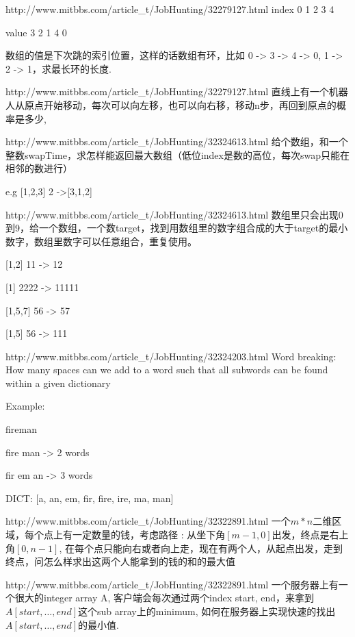 \documentclass[a4paper]{article}
\begin{document}
\begin{CJK}{UTF8}{gbsn}
\begin{enumerate}
\begin{Q}[Google]{http://www.mitbbs.com/article_t/JobHunting/32279127.html}
index 0 1 2 3 4

value 3 2 1 4 0

数组的值是下次跳的索引位置，这样的话数组有环，比如 0 -> 3 -> 4 -> 0, 1 -> 2 
-> 1，求最长环的长度.
\end{Q}

\begin{Q}[Google]{http://www.mitbbs.com/article_t/JobHunting/32279127.html}
直线上有一个机器人从原点开始移动，每次可以向左移，也可以向右移，移动n步，再回到原点的概率是多少,
\end{Q}

\begin{Q}[Amazon]{http://www.mitbbs.com/article_t/JobHunting/32324613.html}
给个数组，和一个整数swapTime，求怎样能返回最大数组（低位index是数的高位，每次swap只能在相邻的数进行）

e.g [1,2,3] 2 ->[3,1,2]
\end{Q}

\begin{Q}[Amazon]{http://www.mitbbs.com/article_t/JobHunting/32324613.html}
数组里只会出现0到9，给一个数组，一个数target，找到用数组里的数字组合成的大于target的最小数字，数组里数字可以任意组合，重复使用。

[1,2] 11 -> 12

[1] 2222 -> 11111

[1,5,7] 56 -> 57

[1,5] 56 -> 111
\end{Q}

\begin{Q}[Facebook]{http://www.mitbbs.com/article_t/JobHunting/32324203.html}
Word breaking: How many spaces can we add to a word such that all subwords can be found within a given dictionary 

Example: 

fireman 

fire man -> 2 words 

fir em an -> 3 words 

DICT: [a, an, em, fir, fire, ire, ma, man]
\end{Q}

\begin{Q}[Google]{http://www.mitbbs.com/article_t/JobHunting/32322891.html}
一个$m*n$二维区域，每个点上有一定数量的钱，考虑路径 : 从坐下角$[m-1, 0]$出发，终点是右上角$[0, n-1]$, 在每个点只能向右或者向上走，现在有两个人，从起点出发，走到终点，问怎么样求出这两个人能拿到的钱的和的最大值
\end{Q}

\begin{Q}[Google]{http://www.mitbbs.com/article_t/JobHunting/32322891.html}
一个服务器上有一个很大的integer array A, 客户端会每次通过两个index start, end，来拿到$A[start, \ldots, end]$这个sub array上的minimum, 如何在服务器上实现快速的找出$A[start, \ldots, end]$的最小值.
\end{Q}


\end{enumerate}
\end{CJK}
\end{document}
